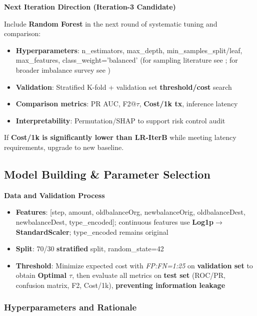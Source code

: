 \documentclass[sigplan,screen]{acmart}
\begin{document}
\textbf{Next Iteration Direction (Iteration-3 Candidate)}

Include \textbf{Random Forest} in the next round of systematic tuning and comparison:

\begin{itemize}
\item \textbf{Hyperparameters}: n\_estimators, max\_depth, min\_samples\_split/leaf, max\_features, class\_weight='balanced' (for sampling literature see \citealp{chawla2002smote}; for broader imbalance survey see \citealp{he2009learning})
\item \textbf{Validation}: Stratified K-fold + validation set \textbf{threshold/cost} search
\item \textbf{Comparison metrics}: PR AUC, F2@$\tau$, \textbf{Cost/1k tx}, inference latency
\item \textbf{Interpretability}: Permutation/SHAP to support risk control audit
\end{itemize}

If \textbf{Cost/1k is significantly lower than LR-IterB} while meeting latency requirements, upgrade to new baseline.

\subsection{Model Building \& Parameter Selection}

\textbf{Data and Validation Process}

\begin{itemize}
\item \textbf{Features}: [step, amount, oldbalanceOrg, newbalanceOrig, oldbalanceDest, newbalanceDest, type\_encoded]; continuous features use \textbf{Log1p$\rightarrow$StandardScaler}; type\_encoded remains original
\item \textbf{Split}: 70/30 \textbf{stratified} split, random\_state=42
\item \textbf{Threshold}: Minimize expected cost with \textit{FP:FN=1:25} on \textbf{validation set} to obtain \textbf{Optimal $\tau$}, then evaluate all metrics on \textbf{test set} (ROC/PR, confusion matrix, F2, Cost/1k), \textbf{preventing information leakage}
\end{itemize}

\subsubsection{Hyperparameters and Rationale}
\end{document}
